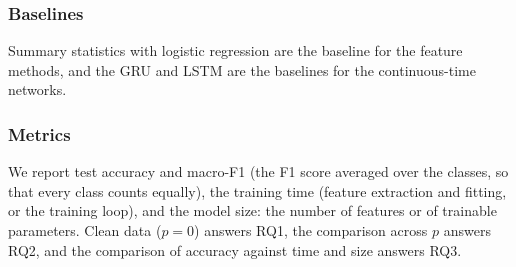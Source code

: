 \subsubsection*{Baselines}
Summary statistics with logistic regression are the baseline for the
feature methods, and the GRU and LSTM are the baselines for the
continuous-time networks.

\subsubsection*{Metrics}
We report test accuracy and macro-F1 (the F1 score averaged over the
classes, so that every class counts equally), the training time (feature
extraction and fitting, or the training loop), and the model size: the
number of features or of trainable parameters. Clean data ($p = 0$)
answers RQ1, the comparison across $p$ answers RQ2, and the comparison of
accuracy against time and size answers RQ3.
